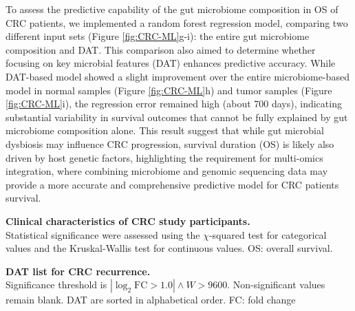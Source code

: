 \documentclass[11pt, a4paper, onecolumn, oneside]{report}
\begin{document}
                To assess the predictive capability of the gut microbiome composition in OS of CRC patients, we implemented a random forest regression model, comparing two different input sets (Figure \ref{fig:CRC-ML}g-i): the entire gut microbiome composition and DAT. This comparison also aimed to determine whether focusing on key microbial features (DAT) enhances predictive accuracy. While DAT-based model showed a slight improvement over the entire microbiome-based model in normal samples (Figure \ref{fig:CRC-ML}h) and tumor samples (Figure \ref{fig:CRC-ML}i), the regression error remained high (about 700 days), indicating substantial variability in survival outcomes that cannot be fully explained by gut microbiome composition alone. This result suggest that while gut microbial dysbiosis may influence CRC progression, survival duration (OS) is likely also driven by host genetic factors, highlighting the requirement for multi-omics integration, where combining microbiome and genomic sequencing data may provide a more accurate and comprehensive predictive model for CRC patients survival.

            \begin{table}
                \centering
                \caption[Clinical characteristics of CRC study participants]{\textbf{Clinical characteristics of CRC study participants.}\\
                    Statistical significance were assessed using the $\chi$-squared test for categorical values and the Kruskal-Wallis test for continuous values. OS: overall survival. }
                
                \nocite{tableone-1}
                \label{tab:CRC-clinical}
            \end{table}
            \clearpage

            \begin{table}
                \centering
                \caption[DAT list for CRC recurrence]{\textbf{DAT list for CRC recurrence.} \\
                Significance threshold is $| \log _2 \textrm{FC} > 1.0| \wedge W > 9600$. Non-significant values remain blank. DAT are sorted in alphabetical order. FC: fold change}
                
                \label{tab:CRC-DAT-recurrence}
            \end{table}
            \clearpage

            {\footnotesize }
\end{document}
